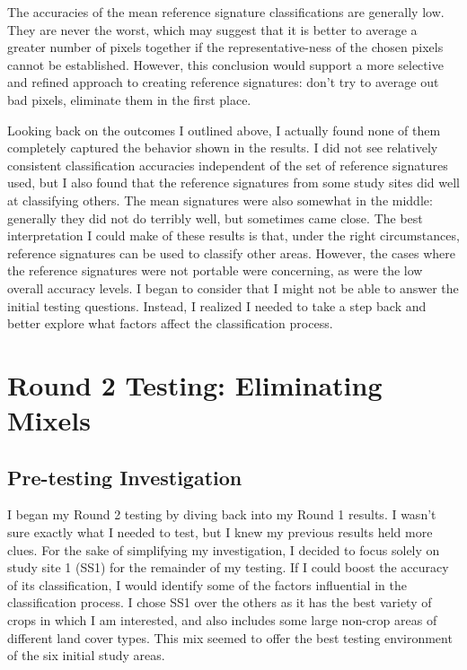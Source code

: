 The accuracies of the mean reference signature classifications are generally low. They are never the worst, which may suggest that it is better to average a greater number of pixels together if the representative-ness of the chosen pixels cannot be established. However, this conclusion would support a more selective and refined approach to creating reference signatures: don’t try to average out bad pixels, eliminate them in the first place.

Looking back on the outcomes I outlined above, I actually found none of them completely captured the behavior shown in the results. I did not see relatively consistent classification accuracies independent of the set of reference signatures used, but I also found that the reference signatures from some study sites did well at classifying others. The mean signatures were also somewhat in the middle: generally they did not do terribly well, but sometimes came close. The best interpretation I could make of these results is that, under the right circumstances, reference signatures can be used to classify other areas. However, the cases where the reference signatures were not portable were concerning, as were the low overall accuracy levels. I began to consider that I might not be able to answer the initial testing questions. Instead, I realized I needed to take a step back and better explore what factors affect the classification process.


\section{Round 2 Testing: Eliminating Mixels}
\label{appendix:testing:r2}

\subsection*{Pre-testing Investigation}

I began my Round 2 testing by diving back into my Round 1 results. I wasn’t sure exactly what I needed to test, but I knew my previous results held more clues. For the sake of simplifying my investigation, I decided to focus solely on study site 1 (SS1) for the remainder of my testing. If I could boost the accuracy of its classification, I would identify some of the factors influential in the classification process. I chose SS1 over the others as it has the best variety of crops in which I am interested, and also includes some large non-crop areas of different land cover types. This mix seemed to offer the best testing environment of the six initial study areas.

